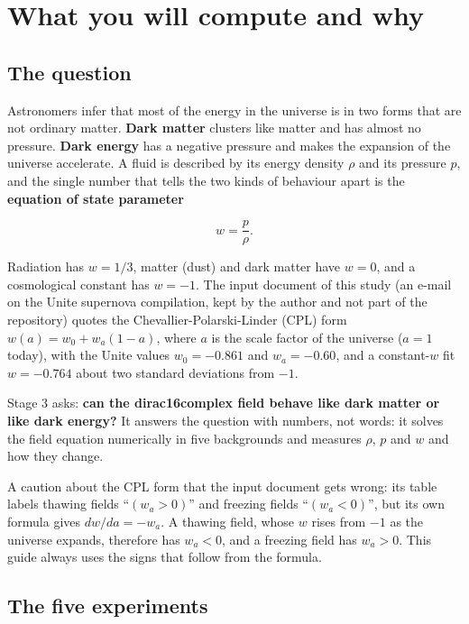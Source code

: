\documentclass[11pt]{article}
\begin{document}
\section{What you will compute and why}

\subsection{The question}

Astronomers infer that most of the energy in the universe is in two forms that are not ordinary matter. \textbf{Dark matter} clusters like matter and has almost no pressure. \textbf{Dark energy} has a negative pressure and makes the expansion of the universe accelerate. A fluid is described by its energy density $\rho$ and its pressure $p$, and the single number that tells the two kinds of behaviour apart is the \textbf{equation of state parameter}

\[
w=\frac{p}{\rho}.
\]

Radiation has $w=1/3$, matter (dust) and dark matter have $w=0$, and a cosmological constant has $w=-1$. The input document of this study (an e-mail on the Unite supernova compilation, kept by the author and not part of the repository) quotes the Chevallier-Polarski-Linder (CPL) form $w(a)=w_0+w_a(1-a)$, where $a$ is the scale factor of the universe ($a=1$ today), with the Unite values $w_0=-0.861$ and $w_a=-0.60$, and a constant-$w$ fit $w=-0.764$ about two standard deviations from $-1$.

Stage 3 asks: \textbf{can the dirac16complex field behave like dark matter or like dark energy?} It answers the question with numbers, not words: it solves the field equation numerically in five backgrounds and measures $\rho$, $p$ and $w$ and how they change.

A caution about the CPL form that the input document gets wrong: its table labels thawing fields ``$(w_a>0)$'' and freezing fields ``$(w_a<0)$'', but its own formula gives $dw/da=-w_a$. A thawing field, whose $w$ rises from $-1$ as the universe expands, therefore has $w_a<0$, and a freezing field has $w_a>0$. This guide always uses the signs that follow from the formula.

\subsection{The five experiments}
\end{document}
